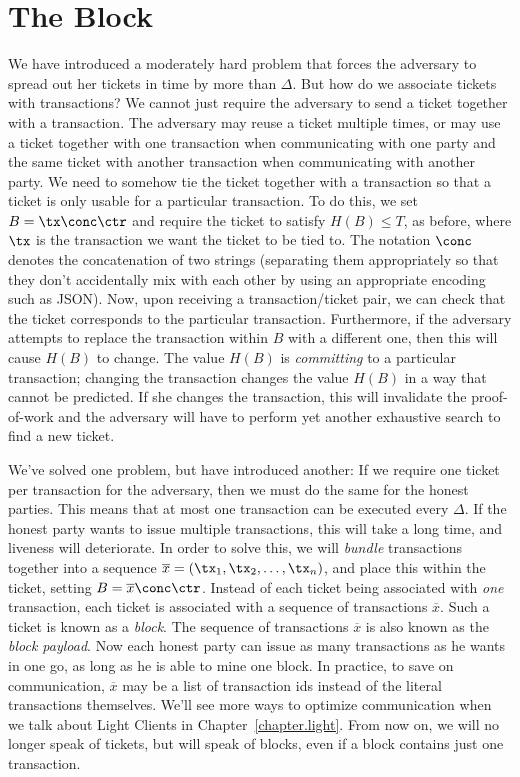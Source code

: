 \section{The Block}

We have introduced a moderately hard problem that forces the adversary to spread out her
tickets in time by more than $\Delta$. But how do we associate tickets with transactions?
We cannot just require the adversary to send a ticket together with a transaction.
The adversary may reuse a ticket multiple times, or may use a ticket together with one transaction
when communicating with one party and the same ticket with another transaction when
communicating with another party. We need to somehow tie the ticket together with a
transaction so that a ticket is only usable for a particular transaction.
To do this, we set $B = \tx \conc \ctr$ and require the ticket to satisfy $H(B) \leq T$,
as before, where $\tx$ is the transaction we want the ticket to be tied to.
The notation $\conc$ denotes the concatenation of two strings (separating them appropriately
so that they don't accidentally mix with each other by using an appropriate encoding such
as JSON).
Now, upon receiving a transaction/ticket pair, we can check that the ticket corresponds
to the particular transaction. Furthermore, if the adversary attempts to replace the
transaction within $B$ with a different one, then this will cause $H(B)$ to change.
The value $H(B)$ is \emph{committing} to a particular transaction; changing the transaction
changes the value $H(B)$ in a way that cannot be predicted. If she changes the transaction,
this will invalidate the proof-of-work and the adversary will have to perform yet another
exhaustive search to find a new ticket.

We've solved one problem, but have introduced another: If we require one ticket per transaction
for the adversary, then we must do the same for the honest parties. This means that at most one
transaction can be executed every $\Delta$. If the honest party wants to issue multiple transactions,
this will take a long time, and liveness will deteriorate. In order to solve this, we will \emph{bundle}
transactions together into a sequence $\overline{x} = (\tx_1, \tx_2, \ldots, \tx_n)$, and place
this within the ticket, setting $B = \overline{x} \conc \ctr$.
Instead of each ticket being associated with \emph{one} transaction, each ticket
is associated with a sequence of transactions $\overline{x}$.
Such a ticket is known as a \emph{block}.
The sequence of transactions $\overline{x}$ is also known as the \emph{block payload}.
Now each honest party can issue as many transactions
as he wants in one go, as long as he is able to mine one block.
In practice, to save on communication, $\overline{x}$ may be a list of transaction ids instead
of the literal transactions themselves. We'll see more ways to optimize communication
when we talk about Light Clients in Chapter~\ref{chapter.light}.
From now on, we will no longer speak of tickets, but will speak of blocks,
even if a block contains just one transaction.

